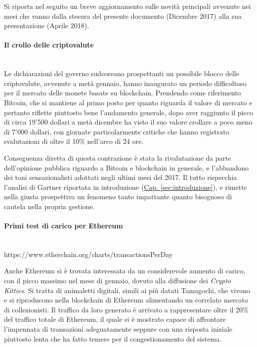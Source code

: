 Si riporta nel seguito un breve aggiornamento sulle novità principali avvenute nei mesi che vanno dalla stesura del presente documento (Dicembre 2017) alla sua presentazione (Aprile 2018).

\paragraph{Il crollo delle criptovalute} ~ \\
    Le dichiarazioni del governo sudcoreano prospettanti un possibile blocco delle criptovalute, avvenute a metà gennaio, hanno inaugurato un periodo difficoltoso per il mercato delle monete basate su blockchain. Prendendo come riferimento Bitcoin, che si mantiene al primo posto per quanto riguarda il valore di mercato e pertanto riflette piuttosto bene l'andamento generale, dopo aver raggiunto il picco di circa 19'500 dollari a metà dicembre ha visto il suo valore crollare a poco meno di 7'000 dollari, con giornate particolarmente critiche che hanno registrato svalutazioni di oltre il 10\% nell'arco di 24 ore.

    Conseguenza diretta di questa contrazione è stata la rivalutazione da parte dell'opinione pubblica riguardo a Bitcoin e blockchain in generale, e l'abbandono dei toni sensazionalisti adottati negli ultimi mesi del 2017. Il tutto rispecchia l'analisi di Gartner riportata in introduzione (\hyperref[sec:introduzione]{Cap. \ref*{sec:introduzione}}), e rimette nella giusta prospettiva un fenomeno tanto impattante quanto bisognoso di cautela nella propria gestione.

\paragraph{Primi test di carico per Ethereum} ~ \\
    https://www.etherchain.org/charts/transactionsPerDay

    Anche Ethereum si è trovata interessata da un considerevole aumento di carico, con il picco massimo nel mese di gennaio, dovuto alla diffusione dei \emph{Crypto Kitties}. Si tratta di animaletti digitali, simili ai più datati Tamagochi, che vivono e si riproducono nella blockchain di Ethereum alimentando un correlato mercato di collezionisti. Il traffico da loro generato è arrivato a rappresentare oltre il 20\% del traffico totale di Ethereum, il quale si è mostrato capace di affrontare l'impennata di transazioni adeguatamente seppure con una risposta iniziale piuttosto lenta che ha fatto temere per il congestionamento del sistema.

